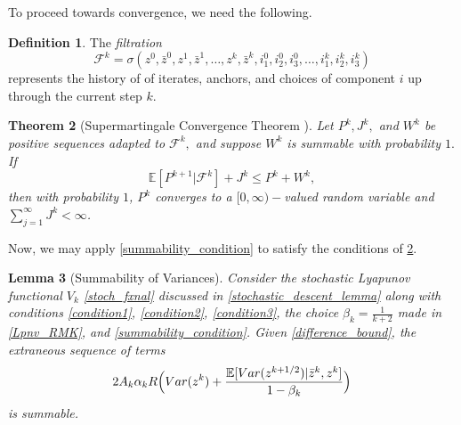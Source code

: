 \documentclass[11pt,reqno,oneside]{amsart}
\newtheorem{theorem}{Theorem}[section]
\newtheorem{lemma}[theorem]{Lemma}
\theoremstyle{definition}
\newtheorem{definition}[theorem]{Definition}
\numberwithin{equation}{section}
\begin{document}
To proceed towards convergence, we need the following.

\begin{definition}
    The \textit{filtration}
    \[\mathcal{F}^{k} = \sigma(z^{0}, \bar{z}^{0}, z^{1}, \bar{z}^{1}, \ldots, z^{k}, \bar{z}^{k}, i_{1}^{0}, i_{2}^{0}, i_{3}^{0}, \ldots, i_{1}^{k}, i_{2}^{k}, i_{3}^{k}) \]
    represents the history of of iterates, anchors, and choices of component $i$ up through the current step $k$.
\end{definition}

\begin{theorem}[Supermartingale Convergence Theorem \cite{combettes2015stochastic}]\label{smct}
    Let $P^{k}, J^{k},$ and $W^{k}$ be positive sequences adapted to $\mathcal{F}^{k},$ and suppose $W^{k}$ is summable with probability $1.$
    If
    \[\mathbb{E}[P^{k+1} | \mathcal{F}^{k}] + J^{k} \leq P^{k} + W^{k},\]
    then with probability $1$, $P^{k}$ converges to a $[0,\infty)-$valued random variable and $\sum_{j=1}^{\infty} J^{k} < \infty$.
\end{theorem}

Now, we may apply \cref{summability_condition} to satisfy the conditions of \cref{smct}.

\begin{lemma}[Summability of Variances] \label{summability_lemma}
    Consider the stochastic Lyapunov functional $V_{k}$ \eqref{stoch_fxnal} discussed in \cref{stochastic_descent_lemma} along with conditions \eqref{condition1}, \eqref{condition2}, \eqref{condition3}, the choice $\beta_{k} = \frac{1}{k+2}$ made in \cref{Lpnv_RMK}, and \cref{summability_condition}.
    Given \eqref{difference_bound}, the extraneous sequence of terms
    \[
        2A_{k}\alpha_{k}R\Big{(} Var(z^{k}) + \frac{\mathbb{E}[Var(z^{k+1/2})|\bar{z}^{k},z^{k}]}{1 - \beta_{k}} \Big{)}
    \]
    is summable.
\end{lemma}
\end{document}
